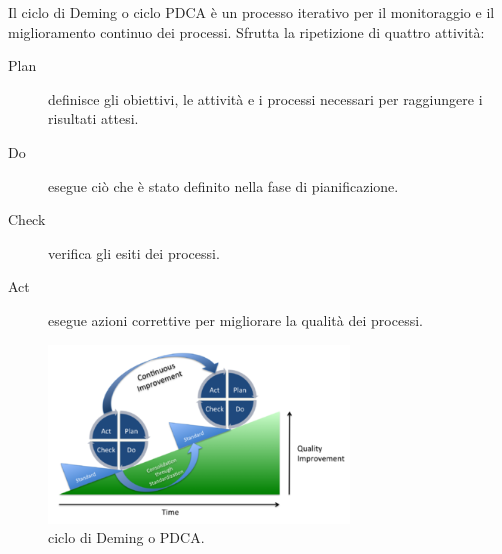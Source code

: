 \documentclass[../../norme-di-progetto.tex]{subfiles}
\begin{document}
Il ciclo di Deming o ciclo PDCA è un processo iterativo per il monitoraggio e il miglioramento continuo dei processi. Sfrutta la ripetizione di quattro attività:

\begin{description}
  \item [Plan] definisce gli obiettivi, le attività e i processi necessari per raggiungere i risultati attesi.
  \item [Do] esegue ciò che è stato definito nella fase di pianificazione.
  \item [Check] verifica gli esiti dei processi.
  \item [Act] esegue azioni correttive per migliorare la qualità dei processi.
\end{description}
\begin{figure}[H]
  \includegraphics[width=8cm]{PDCA-process.png}
  \centering
  \caption{ciclo di Deming o PDCA.}
\end{figure}



\end{document}
